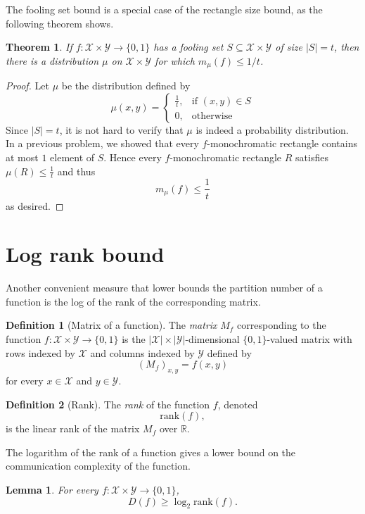 \documentclass[11pt]{amsart}
\theoremstyle{plain}
\newtheorem{theorem}{Theorem}
\newtheorem{lemma}{Lemma}
\theoremstyle{definition}
\newtheorem{definition}{Definition}
\theoremstyle{plain}
\newcommand{\calX}{\mathcal{X}}
\newcommand{\calY}{\mathcal{Y}}
\newcommand{\R}{\mathbb{R}}
\newcommand{\rank}{\mathrm{rank}}
\begin{document}
The fooling set bound is a special case of the rectangle size bound, as the following theorem shows.

\begin{theorem}
If $f : \calX \times \calY \to \{0,1\}$ has a fooling set $S \subseteq \calX \times \calY$ of size $|S| = t$, then there is a distribution $\mu$ on $\calX \times \calY$ for which $m_\mu(f) \le 1/t$.
\end{theorem}

\begin{proof}
Let $\mu$ be the distribution defined by 
$$\mu(x,y) = \begin{cases}
\frac{1}{t}, &\text{if } (x,y) \in S \\
0, &\text{otherwise}
\end{cases}$$
Since $|S| = t$, it is not hard to verify that $\mu$ is indeed a probability distribution. In a previous problem, we showed that every $f$-monochromatic rectangle contains at most $1$ element of $S$. Hence every $f$-monochromatic rectangle $R$ satisfies $\mu(R) \leq \frac{1}{t}$ and thus
$$m_\mu(f) \leq\frac{1}{t}$$
as desired.
\end{proof}


\newpage \section{Log rank bound}

Another convenient measure that lower bounds the partition number of a function is the log of the rank of the corresponding matrix.

\begin{definition}[Matrix of a function]
The \emph{matrix} $M_f$ corresponding to the function $f : \calX \times \calY \to \{0,1\}$ is the $|\calX| \times |\calY|$-dimensional $\{0,1\}$-valued matrix with rows indexed by $\calX$ and columns indexed by $\calY$ defined by
\[
(M_f)_{x,y} = f(x,y)
\]
for every $x \in \calX$ and $y \in \calY$.
\end{definition}

\begin{definition}[Rank]
The \emph{rank} of the function $f$, denoted
\[
\rank(f),
\] 
is the linear rank of the matrix $M_f$ over $\R$.
\end{definition}

The logarithm of the rank of a function gives a lower bound on the communication complexity of the function.

\begin{lemma}
\label{lem:logrank}
For every $f : \calX \times \calY \to \{0,1\}$,
\[
D(f) \ge \log_2 \rank(f).
\]
\end{lemma}
\end{document}
